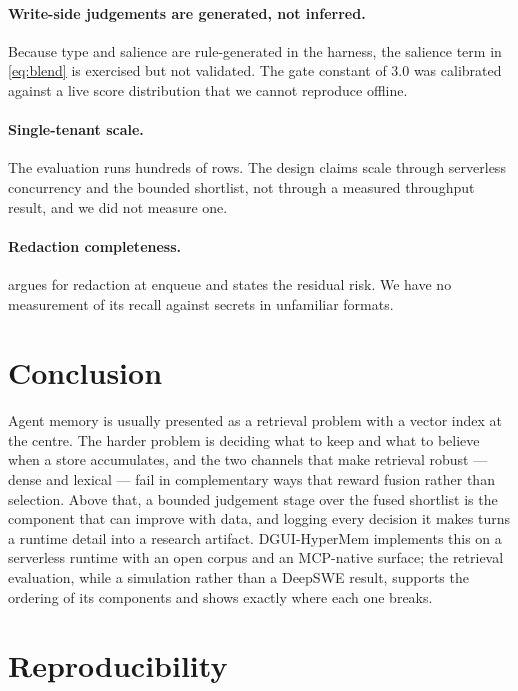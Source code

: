 \documentclass[10pt,twocolumn]{article}
\begin{document}
\paragraph{Write-side judgements are generated, not inferred.}
Because type and salience are rule-generated in the harness, the salience term in
\cref{eq:blend} is exercised but not validated. The gate constant of $3.0$ was
calibrated against a live score distribution that we cannot reproduce offline.

\paragraph{Single-tenant scale.}
The evaluation runs hundreds of rows. The design claims scale through serverless
concurrency and the bounded shortlist, not through a measured throughput
result, and we did not measure one.

\paragraph{Redaction completeness.}
 argues for redaction at enqueue and states the residual risk.
We have no measurement of its recall against secrets in unfamiliar formats.

\section{Conclusion}
\label{sec:conclusion}

Agent memory is usually presented as a retrieval problem with a vector index at
the centre. The harder problem is deciding what to keep and what to believe when
a store accumulates, and the two channels that make retrieval robust --- dense and
lexical --- fail in complementary ways that reward fusion rather than selection.
Above that, a bounded judgement stage over the fused shortlist is the component
that can improve with data, and logging every decision it makes turns a runtime
detail into a research artifact. DGUI-HyperMem implements this on a serverless
runtime with an open corpus and an MCP-native surface; the retrieval
evaluation, while a simulation rather than a DeepSWE result, supports the
ordering of its components and shows exactly where each one breaks.

\section*{Reproducibility}
\end{document}
